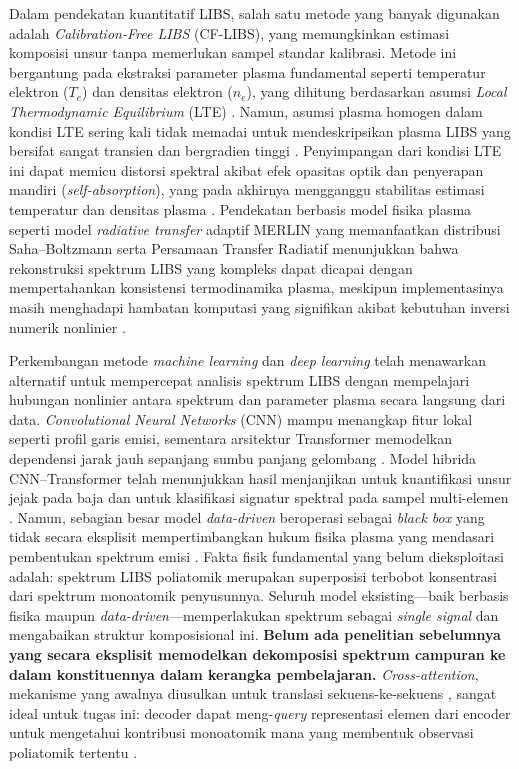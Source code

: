 \documentclass[12pt, a4paper]{article}
\begin{document}
Dalam pendekatan kuantitatif LIBS, salah satu metode yang banyak digunakan adalah \textit{Calibration-Free LIBS} (CF-LIBS), yang memungkinkan estimasi komposisi unsur tanpa memerlukan sampel standar kalibrasi. Metode ini bergantung pada ekstraksi parameter plasma fundamental seperti temperatur elektron ($T_e$) dan densitas elektron ($n_e$), yang dihitung berdasarkan asumsi \textit{Local Thermodynamic Equilibrium} (LTE) \citep{cristoforetti2010}. Namun, asumsi plasma homogen dalam kondisi LTE sering kali tidak memadai untuk mendeskripsikan plasma LIBS yang bersifat sangat transien dan bergradien tinggi \citep{zaitsev2024, bultel2025}. Penyimpangan dari kondisi LTE ini dapat memicu distorsi spektral akibat efek opasitas optik dan penyerapan mandiri (\textit{self-absorption}), yang pada akhirnya mengganggu stabilitas estimasi temperatur dan densitas plasma \citep{tang2024, hansen2021}. Pendekatan berbasis model fisika plasma seperti model \textit{radiative transfer} adaptif MERLIN \citep{favre2025a} yang memanfaatkan distribusi Saha–Boltzmann serta Persamaan Transfer Radiatif menunjukkan bahwa rekonstruksi spektrum LIBS yang kompleks dapat dicapai dengan mempertahankan konsistensi termodinamika plasma, meskipun implementasinya masih menghadapi hambatan komputasi yang signifikan akibat kebutuhan inversi numerik nonlinier \citep{favre2025b}.

Perkembangan metode \textit{machine learning} dan \textit{deep learning} telah menawarkan alternatif untuk mempercepat analisis spektrum LIBS dengan mempelajari hubungan nonlinier antara spektrum dan parameter plasma secara langsung dari data. \textit{Convolutional Neural Networks} (CNN) mampu menangkap fitur lokal seperti profil garis emisi, sementara arsitektur Transformer memodelkan dependensi jarak jauh sepanjang sumbu panjang gelombang \citep{liu2026}. Model hibrida CNN–Transformer telah menunjukkan hasil menjanjikan untuk kuantifikasi unsur jejak pada baja \citep{liu2026} dan untuk klasifikasi signatur spektral pada sampel multi-elemen \citep{walidain2026}. Namun, sebagian besar model \textit{data-driven} beroperasi sebagai \textit{black box} yang tidak secara eksplisit mempertimbangkan hukum fisika plasma yang mendasari pembentukan spektrum emisi \citep{hao2024}. Fakta fisik fundamental yang belum dieksploitasi adalah: spektrum LIBS poliatomik merupakan superposisi terbobot konsentrasi dari spektrum monoatomik penyusunnya. Seluruh model eksisting—baik berbasis fisika maupun \textit{data-driven}—memperlakukan spektrum sebagai \textit{single signal} dan mengabaikan struktur komposisional ini. \textbf{Belum ada penelitian sebelumnya yang secara eksplisit memodelkan dekomposisi spektrum campuran ke dalam konstituennya dalam kerangka pembelajaran.} \textit{Cross-attention}, mekanisme yang awalnya diusulkan untuk translasi sekuens-ke-sekuens \citep{vaswani2017}, sangat ideal untuk tugas ini: decoder dapat meng-\textit{query} representasi elemen dari encoder untuk mengetahui kontribusi monoatomik mana yang membentuk observasi poliatomik tertentu \citep{liu2026, walidain2026}.
\end{document}
